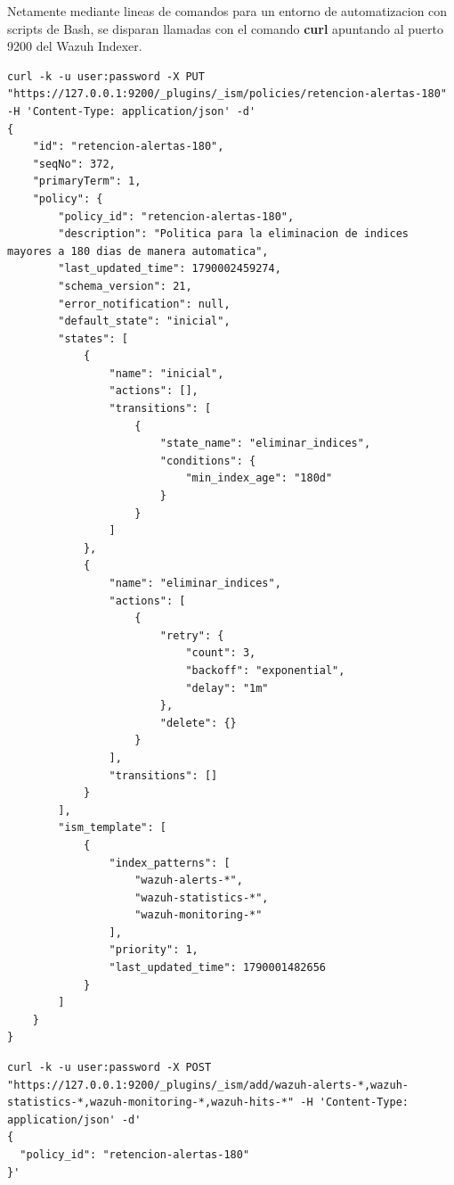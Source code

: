 Netamente mediante lineas de comandos para un entorno de automatizacion con scripts de Bash, se disparan llamadas con el comando \textbf{curl} apuntando al puerto 9200 del Wazuh Indexer.

\begin{lstlisting}[style=logstyle,
    basicstyle=\scriptsize\ttfamily,
    caption={Llamada a la API REST de OpenSearch para crear la politica de retencion.}
]
curl -k -u user:password -X PUT "https://127.0.0.1:9200/_plugins/_ism/policies/retencion-alertas-180" -H 'Content-Type: application/json' -d'
{
    "id": "retencion-alertas-180",
    "seqNo": 372,
    "primaryTerm": 1,
    "policy": {
        "policy_id": "retencion-alertas-180",
        "description": "Politica para la eliminacion de indices mayores a 180 dias de manera automatica",
        "last_updated_time": 1790002459274,
        "schema_version": 21,
        "error_notification": null,
        "default_state": "inicial",
        "states": [
            {
                "name": "inicial",
                "actions": [],
                "transitions": [
                    {
                        "state_name": "eliminar_indices",
                        "conditions": {
                            "min_index_age": "180d"
                        }
                    }
                ]
            },
            {
                "name": "eliminar_indices",
                "actions": [
                    {
                        "retry": {
                            "count": 3,
                            "backoff": "exponential",
                            "delay": "1m"
                        },
                        "delete": {}
                    }
                ],
                "transitions": []
            }
        ],
        "ism_template": [
            {
                "index_patterns": [
                    "wazuh-alerts-*",
                    "wazuh-statistics-*",
                    "wazuh-monitoring-*"
                ],
                "priority": 1,
                "last_updated_time": 1790001482656
            }
        ]
    }
}
\end{lstlisting}

\begin{lstlisting}[style=logstyle,
    basicstyle=\scriptsize\ttfamily,
    caption={Llamada a la API REST de OpenSearch para aplicar la politica de retencion a los indices.}
]
curl -k -u user:password -X POST "https://127.0.0.1:9200/_plugins/_ism/add/wazuh-alerts-*,wazuh-statistics-*,wazuh-monitoring-*,wazuh-hits-*" -H 'Content-Type: application/json' -d'
{
  "policy_id": "retencion-alertas-180"
}'
\end{lstlisting}

